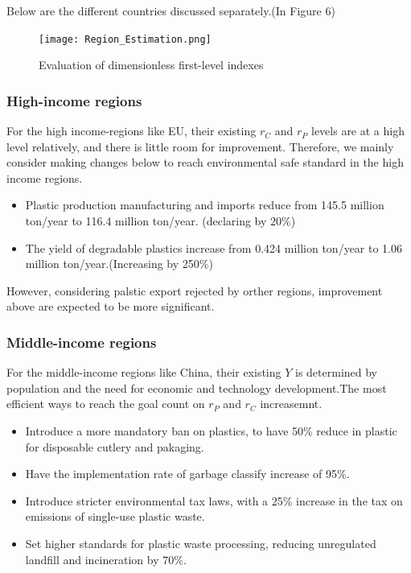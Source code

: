 \documentclass{mcmthesis}
\begin{document}
	Below are the different countries discussed separately.(In Figure 6)
     \begin{figure}[H]
		\centering
		 \texttt{[image: Region\_Estimation.png]}
		\caption{Evaluation of dimensionless first-level indexes}
	\end{figure} 

 \subsubsection{High-income regions}
	For the high income-regions like EU, their existing $r_C$ and $r_P$ levels are at a high level relatively, and there is little room for improvement. Therefore, we mainly consider making changes below to reach environmental safe standard in the high income regions. 
	\begin{itemize}
		\item Plastic production manufacturing and imports reduce from 145.5 million ton/year to 116.4 million ton/year. (declaring by 20\%)
		\item The yield of degradable plastics increase from 0.424 million ton/year to 1.06 million ton/year.(Increasing by 250\%)%
	 \end{itemize}
	   
	 However, considering palstic export rejected by orther regions, improvement above are expected to be more significant.
	
 \subsubsection{Middle-income regions}
	 For the middle-income regions like China, their existing $Y$ is determined by population and the need for economic and technology development.The most efficient ways to reach the goal count on $r_P$ and $r_C$ increasemnt.
	 \begin{itemize}
		\item Introduce a more mandatory ban on plastics, to have 50\% reduce in plastic for disposable cutlery and pakaging.
		\item Have the implementation rate of garbage classify increase of 95\%.
		\item Introduce stricter environmental tax laws, with a 25\% increase in the tax on emissions of single-use plastic waste.
		\item Set higher standards for plastic waste processing, reducing unregulated landfill and incineration by 70\%. 
	 \end{itemize}
\end{document}
